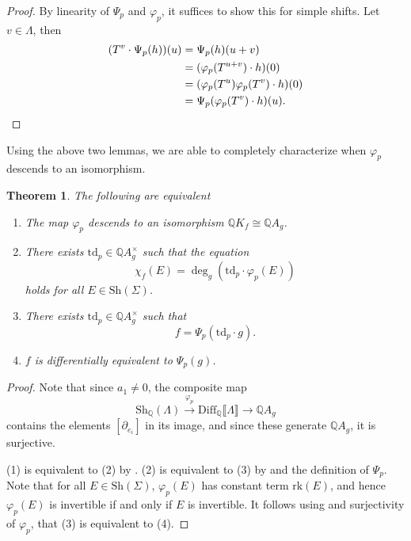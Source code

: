 \documentclass[oneside]{amsart}
\theoremstyle{plain}
\newtheorem{theorem}{Theorem}[section]
\theoremstyle{definition}
\newcommand{\Q}{{\mathbb{Q}}}
\newcommand{\rk}{{\mathrm{rk}}}
\newcommand{\Diff}{{\mathrm{Diff}}}
\newcommand{\Sh}{{\mathrm{Sh}}}
\newcommand{\td}{{\mathrm{td}}}
\begin{document}
\begin{proof}
    By linearity of $\Psi_p$ and $\varphi_p$, it suffices to show this for simple shifts.
    Let $v \in \Lambda$, then
    \begin{align*}
        (T^v \cdot \Psi_p(h))(u) &= \Psi_p(h)(u + v)\\
        &= 
        (\varphi_p(T^{u + v}) \cdot h)(0)\\
        &= (\varphi_p(T^u)\varphi_p(T^v) \cdot h)(0)\\
        &= \Psi_p(\varphi_p(T^v) \cdot h)(u).
        \qedhere
    \end{align*}
\end{proof}

Using the above two lemmas, we are able to completely characterize when $\varphi_p$ descends to an isomorphism.

\begin{theorem}\label{thm:exceptional-general}
    The following are equivalent
    \begin{enumerate}
        \item The map $\varphi_p$ descends to an isomorphism $\Q K_f \cong \Q A_g$.
        \item There exists $\td_p \in \Q A_g^\times$ such that the equation 
            \begin{equation*}
                \chi_f(E) = \deg_g(\td_p \cdot \varphi_p(E))
            \end{equation*}
            holds for all $E \in \Sh(\Sigma)$.
        \item There exists $\td_p \in \Q A_g^\times$ such that
            \[
                f = \Psi_p(\td_p \cdot g).
            \]
        \item $f$ is differentially equivalent to $\Psi_p(g)$.
    \end{enumerate}
    
\end{theorem}

\begin{proof}
    Note that since $a_1 \neq 0$, the composite map
    \[\Sh_\Q(\Lambda) \xrightarrow{\varphi_p} \Diff_\Q\llbracket \Lambda\rrbracket
    \to \Q A_g\]
    contains the elements $[\partial_{e_i}]$ in its image, and since these generate $\Q A_g$, it is surjective.

    (1) is equivalent to (2) by .
    (2) is equivalent to (3) by  and the definition of $\Psi_p$.
    Note that for all $E \in \Sh(\Sigma)$, $\varphi_p(E)$ has constant term $\rk(E)$, and hence $\varphi_p(E)$ is invertible if and only if $E$ is invertible. It follows using  and surjectivity of $\varphi_p$, that (3) is equivalent to (4).
\end{proof}
\end{document}
